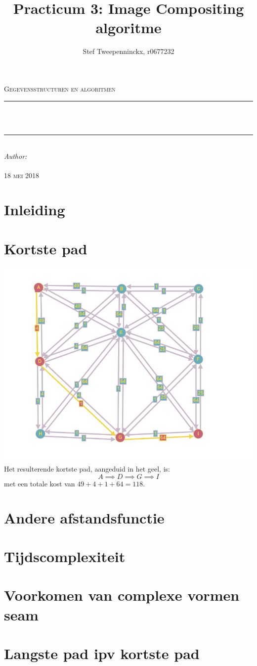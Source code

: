\documentclass[11pt, a4paper]{article}
\author{Stef Tweepenninckx, r0677232}
\title{Practicum 3: Image Compositing algoritme}
\makeatletter
\def\printtitle{                 
    {\large \@title}}
\def\printauthor{                  
    {\large \@author}}
\makeatother
\begin{document}
\begin{titlepage}
\newcommand{\HRule}{\rule{\linewidth}{0.5mm}} 
\center 
\textsc{\LARGE Gegevensstructuren en algoritmen}\\[1.5cm] 
\HRule \\[0.4cm]

{\huge \bfseries \printtitle}\\[0.4cm] 
\HRule \\[0.4cm]

\Large \emph{Author:}\\
 \textsc{\printauthor}\\[3cm]

{\large \textsc{18 mei 2018}}\\[3cm] 

\vfill 
\end{titlepage}

\section*{Inleiding}

\section*{Kortste pad}
\includegraphics[width=\textwidth]{grafe}
\vspace*{10px}
Het resulterende kortste pad, aangeduid in het geel, is: $$A \implies D \implies G \implies I$$ met een totale kost van $49 + 4 + 1 + 64 = 118$.

\section*{Andere afstandsfunctie}
\section*{Tijdscomplexiteit}
\section*{Voorkomen van complexe vormen seam}
\section*{Langste pad ipv kortste pad}


\newpage
\end{document}
